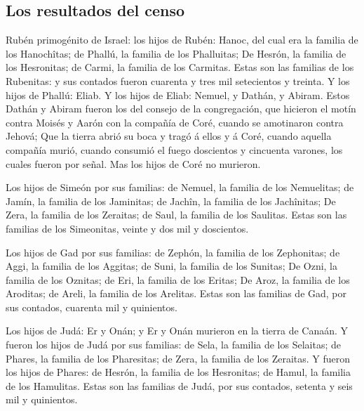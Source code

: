 \hypertarget{los-resultados-del-censo-1}{%
\subsection{Los resultados del censo}\label{los-resultados-del-censo-1}}

 Rubén primogénito de Israel: los hijos de Rubén: Hanoc, del
cual era la familia de los Hanochîtas; de Phallú, la familia de los
Phalluitas;  De Hesrón, la familia de los Hesronitas; de
Carmi, la familia de los Carmitas.  Estas son las familias
de los Rubenitas: y sus contados fueron cuarenta y tres mil setecientos
y treinta.  Y los hijos de Phallú: Eliab.  Y los
hijos de Eliab: Nemuel, y Dathán, y Abiram. Estos Dathán y Abiram fueron
los del consejo de la congregación, que hicieron el motín contra Moisés
y Aarón con la compañía de Coré, cuando se amotinaron contra Jehová;
 Que la tierra abrió su boca y tragó á ellos y á Coré,
cuando aquella compañía murió, cuando consumió el fuego doscientos y
cincuenta varones, los cuales fueron por señal.  Mas los
hijos de Coré no murieron.

 Los hijos de Simeón por sus familias: de Nemuel, la
familia de los Nemuelitas; de Jamín, la familia de los Jaminitas; de
Jachîn, la familia de los Jachînitas;  De Zera, la familia
de los Zeraitas; de Saul, la familia de los Saulitas. 
Estas son las familias de los Simeonitas, veinte y dos mil y doscientos.

 Los hijos de Gad por sus familias: de Zephón, la familia
de los Zephonitas; de Aggi, la familia de los Aggitas; de Suni, la
familia de los Sunitas;  De Ozni, la familia de los
Oznitas; de Eri, la familia de los Eritas;  De Aroz, la
familia de los Aroditas; de Areli, la familia de los Arelitas.
 Estas son las familias de Gad, por sus contados, cuarenta
mil y quinientos.

 Los hijos de Judá: Er y Onán; y Er y Onán murieron en la
tierra de Canaán.  Y fueron los hijos de Judá por sus
familias: de Sela, la familia de los Selaitas; de Phares, la familia de
los Pharesitas; de Zera, la familia de los Zeraitas.  Y
fueron los hijos de Phares: de Hesrón, la familia de los Hesronitas; de
Hamul, la familia de los Hamulitas.  Estas son las familias
de Judá, por sus contados, setenta y seis mil y quinientos.


